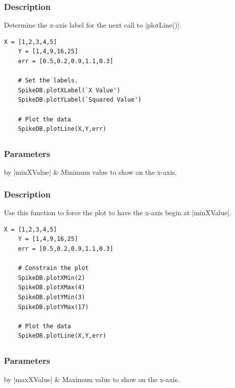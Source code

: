 \documentclass{report}
\begin{document}
\subsubsection{Description}
Determine the x-axis label for the next call to |plotLine()|.
\begin{lstlisting}[caption=Example]
	X = [1,2,3,4,5]
	Y = [1,4,9,16,25]
	err = [0.5,0.2,0.9,1.1,0.3]

	# Set the labels.
	SpikeDB.plotXLabel(`X Value')
	SpikeDB.plotYLabel(`Squared Value')

	# Plot the data
	SpikeDB.plotLine(X,Y,err)
\end{lstlisting}


\clearpage
\subsection{}
\subsubsection{Parameters}
\begin{table}[h]
\begin{center}
\begin{tabular}{by}
		|minXValue| & Minimum value to show on the x-axis.\\
	\end{tabular}
\end{center}
\end{table}
\subsubsection{Description}
Use this function to force the plot to have the x-axis begin at |minXValue|.
\begin{lstlisting}[caption=Example]
	X = [1,2,3,4,5]
	Y = [1,4,9,16,25]
	err = [0.5,0.2,0.9,1.1,0.3]

	# Constrain the plot
	SpikeDB.plotXMin(2)
	SpikeDB.plotXMax(4)
	SpikeDB.plotYMin(3)
	SpikeDB.plotYMax(17)

	# Plot the data
	SpikeDB.plotLine(X,Y,err)
\end{lstlisting}

\clearpage
\subsection{}
\subsubsection{Parameters}
\begin{table}[h]
\begin{center}
\begin{tabular}{by}
		|maxXValue| & Maximum value to show on the x-axis.\\
	\end{tabular}
\end{center}
\end{table}
\end{document}
